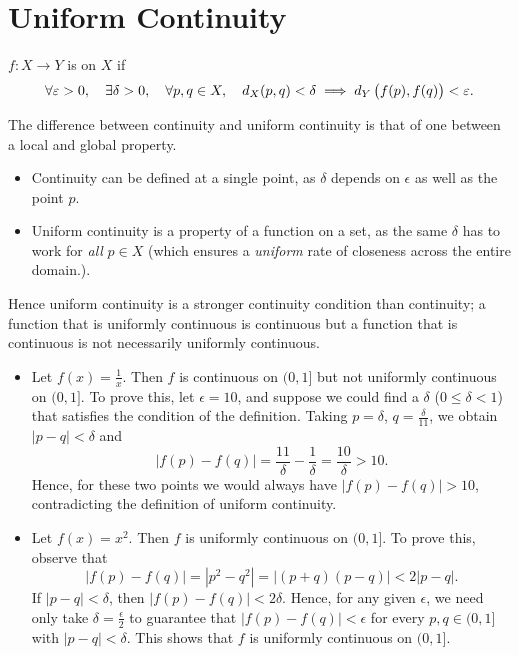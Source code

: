 \section{Uniform Continuity}
\begin{definition}
$f:X\to Y$ is  on $X$ if
\[\forall\varepsilon>0,\quad\exists\delta>0,\quad\forall p,q\in X,\quad d_X(p,q)<\delta\implies d_Y\left(f(p),f(q)\right)<\varepsilon.\]
\end{definition}

\begin{remark}
The difference between continuity and uniform continuity is that of one between a local and global property.
\begin{itemize}
\item Continuity can be defined at a single point, as $\delta$ depends on $\epsilon$ as well as the point $p$.
\item Uniform continuity is a property of a function on a set, as the same $\delta$ has to work for \emph{all} $p\in X$ (which ensures a \emph{uniform} rate of closeness across the entire domain.).
\end{itemize}
Hence uniform continuity is a stronger continuity condition than continuity; a function that is uniformly continuous is continuous but a function that is continuous is not necessarily uniformly continuous.
\end{remark}

\begin{example}
\begin{itemize}
\item Let $f(x)=\frac{1}{x}$. Then $f$ is continuous on $(0,1]$ but not uniformly continuous on $(0,1]$. To prove this, let $\epsilon=10$, and suppose we could find a $\delta$ ($0\le\delta<1$) that satisfies the condition of the definition. Taking $p=\delta$, $q=\frac{\delta}{11}$, we obtain $|p-q|<\delta$ and
\[|f(p)-f(q)|=\frac{11}{\delta}-\frac{1}{\delta}=\frac{10}{\delta}>10.\]
Hence, for these two points we would always have $|f(p)-f(q)|>10$, contradicting the definition of uniform continuity.

\item Let $f(x)=x^2$. Then $f$ is uniformly continuous on $(0,1]$. To prove this, observe that
\[|f(p)-f(q)|=|p^2-q^2|=|(p+q)(p-q)|<2|p-q|.\]
If $|p-q|<\delta$, then $|f(p)-f(q)|<2\delta$. Hence, for any given $\epsilon$, we need only take $\delta=\frac{\epsilon}{2}$ to guarantee that $|f(p)-f(q)|<\epsilon$ for every $p,q\in(0,1]$ with $|p-q|<\delta$. This shows that $f$ is uniformly continuous on $(0,1]$.
\end{itemize}
\end{example}

